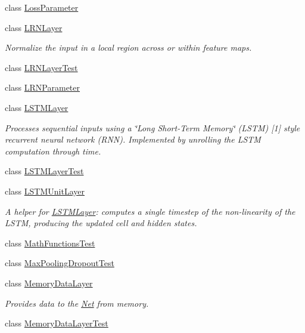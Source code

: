 \begin{DoxyCompactItemize}
class \mbox{\hyperlink{classcaffe_1_1_loss_parameter}{Loss\+Parameter}}
\item 
class \mbox{\hyperlink{classcaffe_1_1_l_r_n_layer}{L\+R\+N\+Layer}}
\begin{DoxyCompactList}\small\item\em Normalize the input in a local region across or within feature maps. \end{DoxyCompactList}\item 
class \mbox{\hyperlink{classcaffe_1_1_l_r_n_layer_test}{L\+R\+N\+Layer\+Test}}
\item 
class \mbox{\hyperlink{classcaffe_1_1_l_r_n_parameter}{L\+R\+N\+Parameter}}
\item 
class \mbox{\hyperlink{classcaffe_1_1_l_s_t_m_layer}{L\+S\+T\+M\+Layer}}
\begin{DoxyCompactList}\small\item\em Processes sequential inputs using a \char`\"{}\+Long Short-\/\+Term Memory\char`\"{} (L\+S\+TM) \mbox{[}1\mbox{]} style recurrent neural network (R\+NN). Implemented by unrolling the L\+S\+TM computation through time. \end{DoxyCompactList}\item 
class \mbox{\hyperlink{classcaffe_1_1_l_s_t_m_layer_test}{L\+S\+T\+M\+Layer\+Test}}
\item 
class \mbox{\hyperlink{classcaffe_1_1_l_s_t_m_unit_layer}{L\+S\+T\+M\+Unit\+Layer}}
\begin{DoxyCompactList}\small\item\em A helper for \mbox{\hyperlink{classcaffe_1_1_l_s_t_m_layer}{L\+S\+T\+M\+Layer}}\+: computes a single timestep of the non-\/linearity of the L\+S\+TM, producing the updated cell and hidden states. \end{DoxyCompactList}\item 
class \mbox{\hyperlink{classcaffe_1_1_math_functions_test}{Math\+Functions\+Test}}
\item 
class \mbox{\hyperlink{classcaffe_1_1_max_pooling_dropout_test}{Max\+Pooling\+Dropout\+Test}}
\item 
class \mbox{\hyperlink{classcaffe_1_1_memory_data_layer}{Memory\+Data\+Layer}}
\begin{DoxyCompactList}\small\item\em Provides data to the \mbox{\hyperlink{classcaffe_1_1_net}{Net}} from memory. \end{DoxyCompactList}\item 
class \mbox{\hyperlink{classcaffe_1_1_memory_data_layer_test}{Memory\+Data\+Layer\+Test}}

\end{DoxyCompactItemize}
